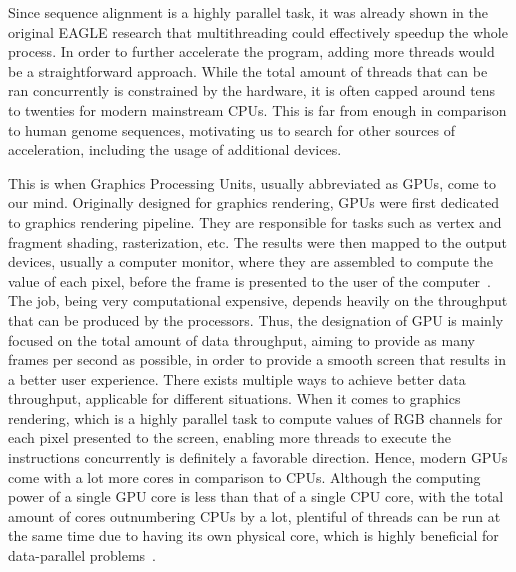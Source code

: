 \documentclass{PHlab-thesis}
\begin{document}
Since sequence alignment is a highly parallel task, it was already shown in the original EAGLE research that multithreading could effectively speedup the whole process. In order to further accelerate the program, adding more threads would be a straightforward approach. While the total amount of threads that can be ran concurrently is constrained by the hardware, it is often capped around tens to twenties for modern mainstream CPUs. This is far from enough in comparison to human genome sequences, motivating us to search for other sources of acceleration, including the usage of additional devices. 

This is when Graphics Processing Units, usually abbreviated as GPUs, come to our mind. Originally designed for graphics rendering, GPUs were first dedicated to graphics rendering pipeline. They are responsible for tasks such as vertex and fragment shading, rasterization, etc. The results were then mapped to the output devices, usually a computer monitor, where they are assembled to compute the value of each pixel, before the frame is presented to the user of the computer~\cite{foley1994introduction,owens2008gpu}. The job, being very computational expensive, depends heavily on the throughput that can be produced by the processors. Thus, the designation of GPU is mainly focused on the total amount of data throughput, aiming to provide as many frames per second as possible, in order to provide a smooth screen that results in a better user experience. There exists multiple ways to achieve better data throughput, applicable for different situations. When it comes to graphics rendering, which is a highly parallel task to compute values of RGB channels for each pixel presented to the screen, enabling more threads to execute the instructions concurrently is definitely a favorable direction. Hence, modern GPUs come with a lot more cores in comparison to CPUs. Although the computing power of a single GPU core is less than that of a single CPU core, with the total amount of cores outnumbering CPUs by a lot, plentiful of threads can be run at the same time due to having its own physical core, which is highly beneficial for data-parallel problems~\cite{navarro2014survey}. 
\end{document}
